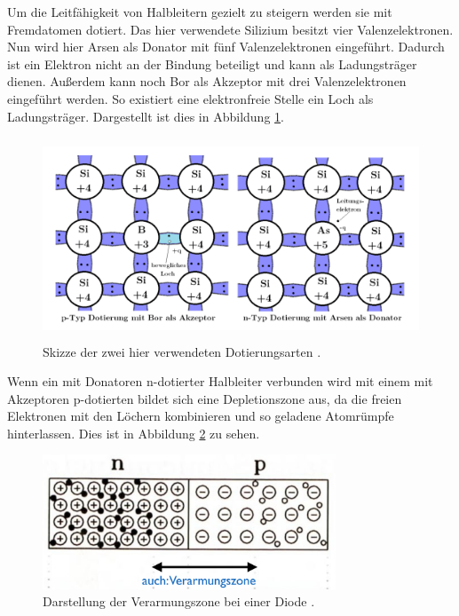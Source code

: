 Um die Leitfähigkeit von Halbleitern gezielt zu steigern werden sie mit Fremdatomen dotiert. Das hier verwendete Silizium besitzt vier Valenzelektronen. Nun wird hier Arsen als Donator mit fünf Valenzelektronen eingeführt. Dadurch ist ein Elektron nicht an der Bindung beteiligt und kann als Ladungsträger dienen. Außerdem kann noch Bor als Akzeptor mit drei Valenzelektronen eingeführt werden. So existiert eine elektronfreie Stelle ein Loch als Ladungsträger. Dargestellt ist dies in Abbildung \ref{fig:dotierung}.

\begin{figure}
  \centering
  \includegraphics[height=6cm]{TimosAufrisse/dotierung.png}
  \caption{Skizze der zwei hier verwendeten Dotierungsarten \cite{anleitung}.}
  \label{fig:dotierung}
\end{figure}

Wenn ein mit Donatoren n-dotierter Halbleiter verbunden wird mit einem mit Akzeptoren p-dotierten bildet sich eine Depletionszone aus, da die freien Elektronen mit den Löchern kombinieren und so geladene Atomrümpfe hinterlassen. Dies ist in Abbildung \ref{fig:pnuebergang} zu sehen.

\begin{figure}
  \centering
  \includegraphics[height=4cm]{TimosAufrisse/pnuebergang.png}
  \caption{Darstellung der Verarmungszone bei einer Diode \cite{goessling}.}
  \label{fig:pnuebergang}
\end{figure}

